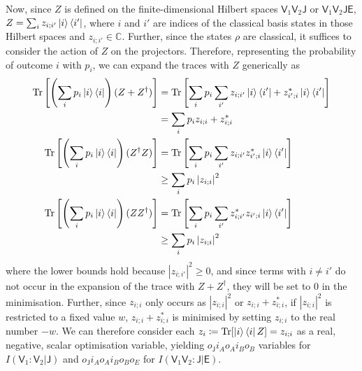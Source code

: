 \documentclass[10pt, a4paper]{article}
\numberwithin{equation}{section} %
\theoremstyle{definition}
\theoremstyle{plain}
\newcommand{\abs}[1]{\left\lvert#1\right\rvert}
\newcommand{\?}{\mathrel{?}} %
\newcommand{\C}{\mathbb{C}} %
\newcommand{\Tr}{\mathrm{Tr}} %
\newcommand{\crv}[1]{\mathsf{#1}}
\begin{document}
    Now, since \(Z\) is defined on the finite-dimensional Hilbert spaces \(\crv{V}_1\crv{V}_2\crv{J}\) or \(\crv{V}_1\crv{V}_2\crv{JE}\), \(Z = \sum_{i} z_{i;i'} \ket{i}\bra{i'}\), where \(i\) and \(i'\) are indices of the classical basis states in those Hilbert spaces and \(z_{i;i'} \in \C\). Further, since the states \(\rho\) are classical, it suffices to consider the action of \(Z\) on the projectors. Therefore, representing the probability of outcome \(i\) with \(p_i\), we can expand the traces with \(Z\) generically as
  \begin{align}
    \Tr\left[\left(\sum_i p_i \ket{i}\bra{i}\right) (Z + Z^{\dagger})\right] &= 
    \Tr\left[ \sum_i p_i \sum_{i'} z_{i;i'} \ket{i}\bra{i'} + {z_{i';i}^*} \ket{i}\bra{i'} \right] \\
                                                            &= 
    \sum_i p_i z_{i;i} + {z_{i;i}^*} \\
    \Tr\left[\left(\sum_i p_i \ket{i}\bra{i}\right) (Z^{\dagger}Z)\right] &=
    \Tr\left[ \sum_i p_i \sum_{i'} z_{i;i'} {z_{i';i}^*} \ket{i}\bra{i'} \right] \\
                                                            &\geq 
    \sum_i p_i \abs{z_{i;i}}^2 \\
    \Tr\left[\left(\sum_i p_i \ket{i}\bra{i}\right) (ZZ^{\dagger})\right] &= 
    \Tr\left[ \sum_i p_i \sum_{i'} {z_{i;i'}^*} z_{i';i} \ket{i}\bra{i'} \right] \\
                                                            &\geq 
    \sum_i p_i \abs{z_{i;i}}^2
  \end{align}
  where the lower bounds hold because \(\abs{z_{i;i'}}^2 \geq 0\), and since terms with \(i \neq i'\) do not occur in the expansion of the trace with \(Z + Z^{\dagger}\), they will be set to 0 in the minimisation. Further, since \(z_{i;i}\) only occurs as \(\abs{z_{i;i}}^2\) or \(z_{i;i} + {z_{i;i}^*}\), if \(\abs{z_{i;i}}^2\) is restricted to a fixed value \(w\), \(z_{i;i} + {z_{i;i}^*}\) is minimised by setting \(z_{i;i}\) to the real number \(-w\). We can therefore consider each \(z_i \coloneqq \Tr[\ket{i}\bra{i} Z] = z_{i;i}\) as a real, negative, scalar optimisation variable, yielding \(o_{\crv{J}} i_A o_A i_B o_B\) variables for \(I(\crv{V}_1 : \crv{V}_2|\crv{J})\) and \(o_{\crv{J}} i_A o_A i_B o_B o_E\) for \(I(\crv{V}_1\crv{V}_2 : \crv{J}|\crv{E})\).
\end{document}
